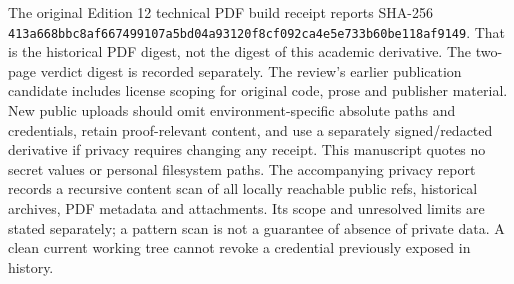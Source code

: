 \documentclass[11pt,letterpaper]{article}
\theoremstyle{definition}\newtheorem{definition}[theorem]{Definition}\newtheorem{example}[theorem]{Example}
\theoremstyle{remark}\newtheorem{remark}[theorem]{Remark}
\begin{document}
The original Edition 12 technical PDF build receipt reports SHA-256 \nolinkurl{413a668bbc8af667499107a5bd04a93120f8cf092ca4e5e733b60be118af9149}. That is the historical PDF digest, not the digest of this academic derivative. The two-page verdict digest is recorded separately. The review's earlier publication candidate includes license scoping for original code, prose and publisher material. New public uploads should omit environment-specific absolute paths and credentials, retain proof-relevant content, and use a separately signed/redacted derivative if privacy requires changing any receipt. This manuscript quotes no secret values or personal filesystem paths. The accompanying privacy report records a recursive content scan of all locally reachable public refs, historical archives, PDF metadata and attachments. Its scope and unresolved limits are stated separately; a pattern scan is not a guarantee of absence of private data. A clean current working tree cannot revoke a credential previously exposed in history.
\end{document}

